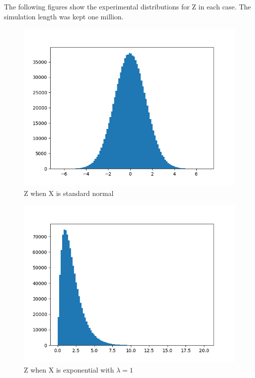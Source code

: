 The following figures show the experimental distributions for Z in each case. The simulation length was kept one million.
\begin{figure}[!ht]
\centering
\includegraphics[width=\columnwidth]{solutions/2016/june/107/figures/norm.png}
\caption{Z when X is standard normal}
\label{june2016-107:fig:normal}
\end{figure}
\begin{figure}[!ht]
\centering
\includegraphics[width=\columnwidth]{solutions/2016/june/107/figures/expon.png}
\caption{Z when X is exponential with $\lambda = 1$}
\label{june2016-107:fig:exponential}
\end{figure}
